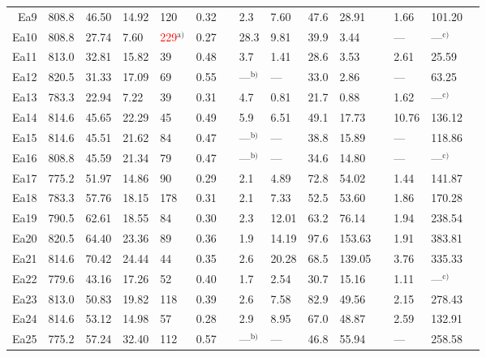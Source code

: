 \documentclass[12pt,onecolumn]{article}
\begin{document}
\begin{landscape}
\begin{table}
\begin{threeparttable}[t]
\begin{tabular}{rllllllllllllll}
Ea9 & 808.8 & 46.50 & 14.92 &  120 & 0.32 &  &  2.3 & 7.60 & 47.6 & 28.91 &  & 1.66 &101.20 \\ 
Ea10 & 808.8 & 27.74 & 7.60 &  \textcolor{red}{229}$^\text{a)}$ & 0.27 &  & 28.3 & 9.81 & 39.9 & 3.44 &  & --- &---$^\text{c)}$\\ 
Ea11 & 813.0 & 32.81 & 15.82 &   39 & 0.48 &  &  3.7 & 1.41 & 28.6 & 3.53 &  & 2.61 &25.59 \\ 
Ea12 & 820.5 & 31.33 & 17.09 &   69 & 0.55 &  & ---$^\text{b)}$ & --- &33.0 & 2.86 & & --- &63.25 \\ 
Ea13 & 783.3 & 22.94 & 7.22 &   39 & 0.31 &  &  4.7 & 0.81 & 21.7 & 0.88 &  & 1.62 &---$^\text{c)}$\\ 
Ea14 & 814.6 & 45.65 & 22.29 &   45 & 0.49 &  &  5.9 & 6.51 & 49.1 & 17.73 &  & 10.76 &136.12 \\ 
Ea15 & 814.6 & 45.51 & 21.62 &   84 & 0.47 &  & ---$^\text{b)}$ & --- &38.8 & 15.89 & & --- &118.86 \\ 
Ea16 & 808.8 & 45.59 & 21.34 &   79 & 0.47 &  & ---$^\text{b)}$ & --- &34.6 & 14.80 & & --- &---$^\text{c)}$\\ 
Ea17 & 775.2 & 51.97 & 14.86 &   90 & 0.29 &  &  2.1 & 4.89 & 72.8 & 54.02 &  & 1.44 &141.87 \\ 
Ea18 & 783.3 & 57.76 & 18.15 &  178 & 0.31 &  &  2.1 & 7.33 & 52.5 & 53.60 &  & 1.86 &170.28 \\ 
Ea19 & 790.5 & 62.61 & 18.55 &   84 & 0.30 &  &  2.3 & 12.01 & 63.2 & 76.14 &  & 1.94 &238.54 \\ 
Ea20 & 820.5 & 64.40 & 23.36 &   89 & 0.36 &  &  1.9 & 14.19 & 97.6 & 153.63 &  & 1.91 &383.81 \\ 
Ea21 & 814.6 & 70.42 & 24.44 &   44 & 0.35 &  &  2.6 & 20.28 & 68.5 & 139.05 &  & 3.76 &335.33 \\ 
Ea22 & 779.6 & 43.16 & 17.26 &   52 & 0.40 &  &  1.7 & 2.54 & 30.7 & 15.16 &  & 1.11 &---$^\text{c)}$\\ 
Ea23 & 813.0 & 50.83 & 19.82 &  118 & 0.39 &  &  2.6 & 7.58 & 82.9 & 49.56 &  & 2.15 &278.43 \\ 
Ea24 & 814.6 & 53.12 & 14.98 &   57 & 0.28 &  &  2.9 & 8.95 & 67.0 & 48.87 &  & 2.59 &132.91 \\ 
Ea25 & 775.2 & 57.24 & 32.40 &  112 & 0.57 &  & ---$^\text{b)}$ & --- &46.8 & 55.94 & & --- &258.58 \\ 


\end{tabular}
\end{threeparttable}
\end{table}
\end{landscape}
\end{document}
